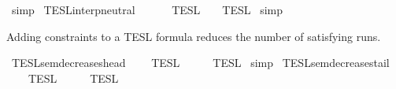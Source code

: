 \begin{isabellebody}
%
\isadelimproof
%
\endisadelimproof
%
\isatagproof
{}\isamarkupfalse%
\ simp%
\endisatagproof
{\isafoldproof}%
%
\isadelimproof
\isanewline
%
\endisadelimproof
\isanewline
{}\isamarkupfalse%
\ TESL{\isacharunderscore}interp{\isacharunderscore}neutral{}{\isacharcolon}\isanewline
\ \ {\isacartoucheopen}{\isasymlbrakk}{\isasymlbrakk}\ {\isasymPhi}\ {\isacharat}\ {\isacharbrackleft}{\isacharbrackright}\ {\isasymrbrakk}{\isasymrbrakk}\isactrlsub T\isactrlsub E\isactrlsub S\isactrlsub L\ {\isacharequal}\ {\isasymlbrakk}{\isasymlbrakk}\ {\isasymPhi}\ {\isasymrbrakk}{\isasymrbrakk}\isactrlsub T\isactrlsub E\isactrlsub S\isactrlsub L{\isacartoucheclose}\isanewline
%
\isadelimproof
%
\endisadelimproof
%
\isatagproof
{}\isamarkupfalse%
\ simp%
\endisatagproof
{\isafoldproof}%
%
\isadelimproof
%
\endisadelimproof
%
\isadelimdocument
%
\endisadelimdocument
%
\isatagdocument
%
\isamarkuptrue%
%
\endisatagdocument
{\isafolddocument}%
%
\isadelimdocument
%
\endisadelimdocument
%
\begin{isamarkuptext}%
Adding constraints to a TESL formula reduces the number of satisfying runs.%
\end{isamarkuptext}\isamarkuptrue%
\isamarkupfalse%
\ TESL{\isacharunderscore}sem{\isacharunderscore}decreases{\isacharunderscore}head{\isacharcolon}\isanewline
\ \ {\isacartoucheopen}{\isasymlbrakk}{\isasymlbrakk}\ {\isasymPhi}\ {\isasymrbrakk}{\isasymrbrakk}\isactrlsub T\isactrlsub E\isactrlsub S\isactrlsub L\ {\isasymsupseteq}\ {\isasymlbrakk}{\isasymlbrakk}\ {\isasymphi}\ {\isacharhash}\ {\isasymPhi}\ {\isasymrbrakk}{\isasymrbrakk}\isactrlsub T\isactrlsub E\isactrlsub S\isactrlsub L{\isacartoucheclose}\isanewline
%
\isadelimproof
%
\endisadelimproof
%
\isatagproof
{}\isamarkupfalse%
\ simp%
\endisatagproof
{\isafoldproof}%
%
\isadelimproof
\isanewline
%
\endisadelimproof
\isanewline
{}\isamarkupfalse%
\ TESL{\isacharunderscore}sem{\isacharunderscore}decreases{\isacharunderscore}tail{\isacharcolon}\isanewline
\ \ {\isacartoucheopen}{\isasymlbrakk}{\isasymlbrakk}\ {\isasymPhi}\ {\isasymrbrakk}{\isasymrbrakk}\isactrlsub T\isactrlsub E\isactrlsub S\isactrlsub L\ {\isasymsupseteq}\ {\isasymlbrakk}{\isasymlbrakk}\ {\isasymPhi}\ {\isacharat}\ {\isacharbrackleft}{\isasymphi}{\isacharbrackright}\ {\isasymrbrakk}{\isasymrbrakk}\isactrlsub T\isactrlsub E\isactrlsub S\isactrlsub L{\isacartoucheclose}\isanewline
%
\isadelimproof
%
\endisadelimproof
%
\isatagproof
{}\isamarkupfalse%

\end{isabellebody}
